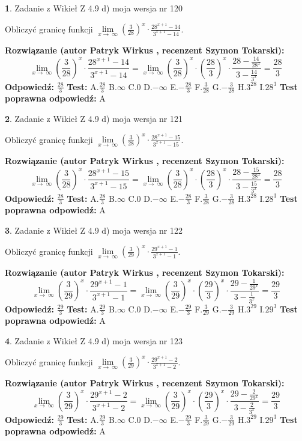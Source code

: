 \documentclass[12pt, a4paper]{article}
\theoremstyle{definition} %
\newtheorem{zad}{}
\newcommand{\zadStart}[1]{\begin{zad}#1\newline}
\newcommand{\zadStop}{\end{zad}}
\newcommand{\rozwStart}[2]{\noindent \textbf{Rozwiązanie (autor #1 , recenzent #2): }\newline}
\newcommand{\rozwStop}{\newline}
\newcommand{\odpStart}{\noindent \textbf{Odpowiedź:}\newline}
\newcommand{\odpStop}{\newline}
\newcommand{\testStart}{\noindent \textbf{Test:}\newline}
\newcommand{\testStop}{\newline}
\newcommand{\kluczStart}{\noindent \textbf{Test poprawna odpowiedź:}\newline}
\newcommand{\kluczStop}{\newline}
\begin{document}
\zadStart{Zadanie z Wikieł Z 4.9 d) moja wersja nr 120}


Obliczyć granicę funkcji  $\lim\limits_{x\to\ \infty}(\frac{3}{28})^{x}\cdot\frac{28^{x+1}-14}{3^{x+1}-14}$.
\zadStop
\rozwStart{Patryk Wirkus}{Szymon Tokarski}
$$\lim\limits_{x\to\ \infty}(\frac{3}{28})^{x}\cdot\frac{28^{x+1}-14}{3^{x+1}-14}=\lim\limits_{x\to\ \infty}(\frac{3}{28})^{x}\cdot(\frac{28}{3})^{x} \cdot \frac{28-\frac{14}{28^{x}}}{3-\frac{14}{3^{x}}} = \frac{28}{3}$$
\rozwStop
\odpStart
$\frac{28}{3}$
\odpStop
\testStart
A.$\frac{28}{3}$ B.$\infty$ C.$0$ D.$-\infty$ E.$-\frac{28}{3}$
F.$\frac{3}{28}$ G.$-\frac{3}{28}$
H.$3^{28}$
I.$28^{3}$
\testStop
\kluczStart
A
\kluczStop



\zadStart{Zadanie z Wikieł Z 4.9 d) moja wersja nr 121}


Obliczyć granicę funkcji  $\lim\limits_{x\to\ \infty}(\frac{3}{28})^{x}\cdot\frac{28^{x+1}-15}{3^{x+1}-15}$.
\zadStop
\rozwStart{Patryk Wirkus}{Szymon Tokarski}
$$\lim\limits_{x\to\ \infty}(\frac{3}{28})^{x}\cdot\frac{28^{x+1}-15}{3^{x+1}-15}=\lim\limits_{x\to\ \infty}(\frac{3}{28})^{x}\cdot(\frac{28}{3})^{x} \cdot \frac{28-\frac{15}{28^{x}}}{3-\frac{15}{3^{x}}} = \frac{28}{3}$$
\rozwStop
\odpStart
$\frac{28}{3}$
\odpStop
\testStart
A.$\frac{28}{3}$ B.$\infty$ C.$0$ D.$-\infty$ E.$-\frac{28}{3}$
F.$\frac{3}{28}$ G.$-\frac{3}{28}$
H.$3^{28}$
I.$28^{3}$
\testStop
\kluczStart
A
\kluczStop



\zadStart{Zadanie z Wikieł Z 4.9 d) moja wersja nr 122}


Obliczyć granicę funkcji  $\lim\limits_{x\to\ \infty}(\frac{3}{29})^{x}\cdot\frac{29^{x+1}-1}{3^{x+1}-1}$.
\zadStop
\rozwStart{Patryk Wirkus}{Szymon Tokarski}
$$\lim\limits_{x\to\ \infty}(\frac{3}{29})^{x}\cdot\frac{29^{x+1}-1}{3^{x+1}-1}=\lim\limits_{x\to\ \infty}(\frac{3}{29})^{x}\cdot(\frac{29}{3})^{x} \cdot \frac{29-\frac{1}{29^{x}}}{3-\frac{1}{3^{x}}} = \frac{29}{3}$$
\rozwStop
\odpStart
$\frac{29}{3}$
\odpStop
\testStart
A.$\frac{29}{3}$ B.$\infty$ C.$0$ D.$-\infty$ E.$-\frac{29}{3}$
F.$\frac{3}{29}$ G.$-\frac{3}{29}$
H.$3^{29}$
I.$29^{3}$
\testStop
\kluczStart
A
\kluczStop



\zadStart{Zadanie z Wikieł Z 4.9 d) moja wersja nr 123}


Obliczyć granicę funkcji  $\lim\limits_{x\to\ \infty}(\frac{3}{29})^{x}\cdot\frac{29^{x+1}-2}{3^{x+1}-2}$.
\zadStop
\rozwStart{Patryk Wirkus}{Szymon Tokarski}
$$\lim\limits_{x\to\ \infty}(\frac{3}{29})^{x}\cdot\frac{29^{x+1}-2}{3^{x+1}-2}=\lim\limits_{x\to\ \infty}(\frac{3}{29})^{x}\cdot(\frac{29}{3})^{x} \cdot \frac{29-\frac{2}{29^{x}}}{3-\frac{2}{3^{x}}} = \frac{29}{3}$$
\rozwStop
\odpStart
$\frac{29}{3}$
\odpStop
\testStart
A.$\frac{29}{3}$ B.$\infty$ C.$0$ D.$-\infty$ E.$-\frac{29}{3}$
F.$\frac{3}{29}$ G.$-\frac{3}{29}$
H.$3^{29}$
I.$29^{3}$
\testStop
\kluczStart
A
\kluczStop
\end{document}
